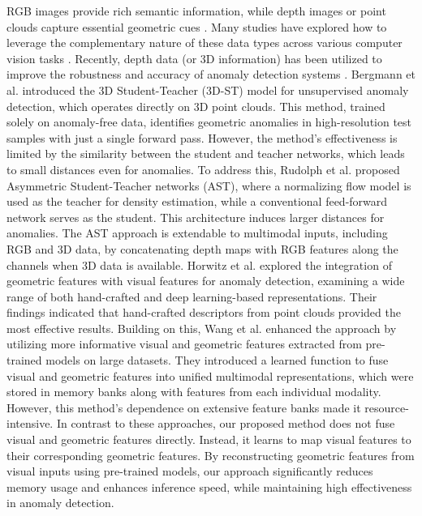 RGB images provide rich semantic information, while depth images or point clouds capture essential geometric cues \cite{hoang2022voting, horwitz2022empirical, hoang2023grasp, horwitz2023back}. Many studies have explored how to leverage the complementary nature of these data types across various computer vision tasks \cite{hoang2024multi}. Recently, depth data (or 3D information) has been utilized to improve the robustness and accuracy of anomaly detection systems \cite{horwitz2022empirical, wang2023multimodal}. Bergmann et al. \cite{bergmann2023anomaly} introduced the 3D Student-Teacher (3D-ST) model for unsupervised anomaly detection, which operates directly on 3D point clouds. This method, trained solely on anomaly-free data, identifies geometric anomalies in high-resolution test samples with just a single forward pass. However, the method's effectiveness is limited by the similarity between the student and teacher networks, which leads to small distances even for anomalies. To address this, Rudolph et al. \cite{rudolph2023asymmetric} proposed Asymmetric Student-Teacher networks (AST), where a normalizing flow model is used as the teacher for density estimation, while a conventional feed-forward network serves as the student. This architecture induces larger distances for anomalies. The AST approach is extendable to multimodal inputs, including RGB and 3D data, by concatenating depth maps with RGB features along the channels when 3D data is available. Horwitz et al. \cite{horwitz2023back} explored the integration of geometric features with visual features for anomaly detection, examining a wide range of both hand-crafted and deep learning-based representations. Their findings indicated that hand-crafted descriptors from point clouds provided the most effective results. Building on this, Wang et al. \cite{wang2023multimodal} enhanced the approach by utilizing more informative visual and geometric features extracted from pre-trained models on large datasets. They introduced a learned function to fuse visual and geometric features into unified multimodal representations, which were stored in memory banks along with features from each individual modality. However, this method's dependence on extensive feature banks made it resource-intensive. In contrast to these approaches, our proposed method does not fuse visual and geometric features directly. Instead, it learns to map visual features to their corresponding geometric features. By reconstructing geometric features from visual inputs using pre-trained models, our approach significantly reduces memory usage and enhances inference speed, while maintaining high effectiveness in anomaly detection.
